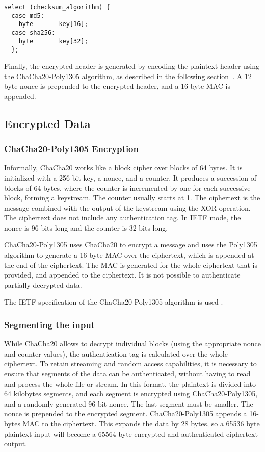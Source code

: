 %
\begin{verbatim}
select (checksum_algorithm) {
  case md5:
    byte       key[16];
  case sha256:
    byte       key[32];
  };
\end{verbatim}


Finally, the encrypted header is generated by encoding the plaintext header using the ChaCha20-Poly1305 algorithm, as described in the following section~\cite{RFC8439}. 
A 12 byte nonce is prepended to the encrypted header, and a 16 byte MAC is appended.

\subsection{Encrypted Data}\label{encrypted:data}
\subsubsection{ChaCha20-Poly1305 Encryption}

Informally, ChaCha20 works like a block cipher over blocks of 64 bytes.
%
It is initialized with a 256-bit key, a nonce, and a counter.
%
It produces a succession of blocks of 64 bytes, where the counter is incremented by one for each successive block, forming a keystream.
%
The counter usually starts at 1.
%
The ciphertext is the message combined with the output of the keystream using the XOR operation.
%
The ciphertext does not include any authentication tag.
%
In IETF mode, the nonce is 96 bits long and the counter is 32 bits long.

ChaCha20-Poly1305 uses ChaCha20 to encrypt a message and uses the Poly1305 algorithm to generate a 16-byte MAC over the ciphertext, which is appended at the end of the ciphertext.
%
The MAC is generated for the whole ciphertext that is provided, and appended to the ciphertext.
%
It is not possible to authenticate partially decrypted data.

The IETF specification of the ChaCha20-Poly1305 algorithm is used \cite{RFC8439}.

\subsubsection{Segmenting the input}
%
While ChaCha20 allows to decrypt individual blocks (using the appropriate nonce and counter values), the authentication tag is calculated over the whole ciphertext.
%
To retain streaming and random access capabilities, it is necessary to ensure that segments of the data can be authenticated, without having to read and process the whole file or stream.
%
In this format, the plaintext is divided into 64 kilobytes segments, and each segment is encrypted using ChaCha20-Poly1305, and a randomly-generated 96-bit nonce. The last segment must be smaller.
%
The nonce is prepended to the encrypted segment. ChaCha20-Poly1305 appends a 16-bytes MAC to the ciphertext.
%
This expands the data by 28 bytes, so a 65536 byte plaintext input will become a 65564 byte encrypted and authenticated ciphertext output.

